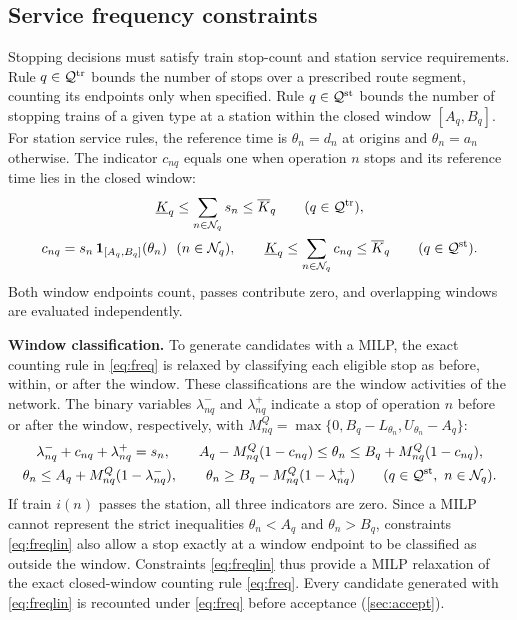 \subsection{Service frequency constraints}
Stopping decisions must satisfy train stop-count and station service requirements. Rule $q\in\mathcal{Q}^{\mathrm{tr}}$ bounds the number of stops over a prescribed route segment, counting its endpoints only when specified. Rule $q\in\mathcal{Q}^{\mathrm{st}}$ bounds the number of stopping trains of a given type at a station within the closed window $[A_q,B_q]$. For station service rules, the reference time is $\theta_n=d_n$ at origins and $\theta_n=a_n$ otherwise. The indicator $c_{nq}$ equals one when operation $n$ stops and its reference time lies in the closed window:
\begin{equation}
\begin{gathered}
\underline{K}_q\le\sum_{n\in\mathcal{N}_q}s_n\le\overline{K}_q\qquad(q\in\mathcal{Q}^{\mathrm{tr}}),\\
c_{nq}=s_n\,\mathbf{1}_{[A_q,B_q]}(\theta_n)\ \ (n\in\mathcal{N}_q),\qquad \underline{K}_q\le\sum_{n\in\mathcal{N}_q}c_{nq}\le\overline{K}_q\qquad(q\in\mathcal{Q}^{\mathrm{st}}).
\end{gathered}\label{eq:freq}
\end{equation}
Both window endpoints count, passes contribute zero, and overlapping windows are evaluated independently.

\textbf{Window classification.} To generate candidates with a MILP, the exact counting rule in \eqref{eq:freq} is relaxed by classifying each eligible stop as before, within, or after the window. These classifications are the window activities of the network. The binary variables $\lambda^-_{nq}$ and $\lambda^+_{nq}$ indicate a stop of operation $n$ before or after the window, respectively, with $M^Q_{nq}=\max\{0,B_q-L_{\theta_n},U_{\theta_n}-A_q\}$:
\begin{equation}
\begin{gathered}
\lambda^-_{nq}+c_{nq}+\lambda^+_{nq}=s_n,\qquad
A_q-M^Q_{nq}(1-c_{nq})\le\theta_n\le B_q+M^Q_{nq}(1-c_{nq}),\\
\theta_n\le A_q+M^Q_{nq}(1-\lambda^-_{nq}),\qquad
\theta_n\ge B_q-M^Q_{nq}(1-\lambda^+_{nq})\qquad(q\in\Qset^{\mathrm{st}},\ n\in\Nset_q).
\end{gathered}\label{eq:freqlin}
\end{equation}
If train $i(n)$ passes the station, all three indicators are zero. Since a MILP cannot represent the strict inequalities $\theta_n<A_q$ and $\theta_n>B_q$, constraints \eqref{eq:freqlin} also allow a stop exactly at a window endpoint to be classified as outside the window. Constraints \eqref{eq:freqlin} thus provide a MILP relaxation of the exact closed-window counting rule \eqref{eq:freq}. Every candidate generated with \eqref{eq:freqlin} is recounted under \eqref{eq:freq} before acceptance (\cref{sec:accept}).

